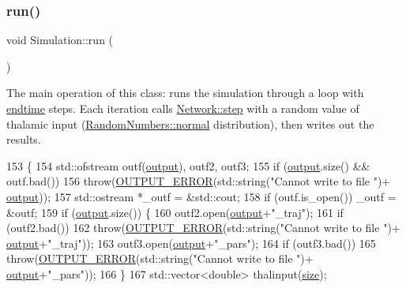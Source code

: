 \subsubsection{\texorpdfstring{run()}{run()}}
{\footnotesize\ttfamily void Simulation\+::run (\begin{DoxyParamCaption}{ }\end{DoxyParamCaption})}

The main operation of this class\+: runs the simulation through a loop with \hyperlink{classSimulation_ae57735a4ad942d9d217fb2235a644d1b}{endtime} steps. Each iteration calls \hyperlink{classNetwork_a53665a3a69e6ec894c313d0ce3fb7f34}{Network\+::step} with a random value of thalamic input (\hyperlink{classRandomNumbers_a4ef5917200da65aa267735d389bdf995}{Random\+Numbers\+::normal} distribution), then writes out the results. 
\begin{DoxyCode}
153                      \{
154     std::ofstream outf(\hyperlink{classSimulation_a9ad4c807c6ddf9066041f764f0ccb9dc}{output}), outf2, outf3;
155     \textcolor{keywordflow}{if} (\hyperlink{classSimulation_a9ad4c807c6ddf9066041f764f0ccb9dc}{output}.size() && outf.bad()) 
156         \textcolor{keywordflow}{throw}(\hyperlink{classOUTPUT__ERROR}{OUTPUT\_ERROR}(std::string(\textcolor{stringliteral}{"Cannot write to file "})+
      \hyperlink{classSimulation_a9ad4c807c6ddf9066041f764f0ccb9dc}{output}));
157     std::ostream *\_outf = &std::cout;
158     \textcolor{keywordflow}{if} (outf.is\_open()) \_outf = &outf;
159     \textcolor{keywordflow}{if} (\hyperlink{classSimulation_a9ad4c807c6ddf9066041f764f0ccb9dc}{output}.size()) \{
160         outf2.open(\hyperlink{classSimulation_a9ad4c807c6ddf9066041f764f0ccb9dc}{output}+\textcolor{stringliteral}{"\_traj"});
161         \textcolor{keywordflow}{if} (outf2.bad())
162             \textcolor{keywordflow}{throw}(\hyperlink{classOUTPUT__ERROR}{OUTPUT\_ERROR}(std::string(\textcolor{stringliteral}{"Cannot write to file "})+
      \hyperlink{classSimulation_a9ad4c807c6ddf9066041f764f0ccb9dc}{output}+\textcolor{stringliteral}{"\_traj"}));
163         outf3.open(\hyperlink{classSimulation_a9ad4c807c6ddf9066041f764f0ccb9dc}{output}+\textcolor{stringliteral}{"\_pars"});
164         \textcolor{keywordflow}{if} (outf3.bad())
165             \textcolor{keywordflow}{throw}(\hyperlink{classOUTPUT__ERROR}{OUTPUT\_ERROR}(std::string(\textcolor{stringliteral}{"Cannot write to file "})+
      \hyperlink{classSimulation_a9ad4c807c6ddf9066041f764f0ccb9dc}{output}+\textcolor{stringliteral}{"\_pars"}));
166     \}
167     std::vector<double> thalinput(\hyperlink{classSimulation_ae198f9ac020ed6bc6ebbd608ab3f959d}{size});

\end{DoxyCode}
